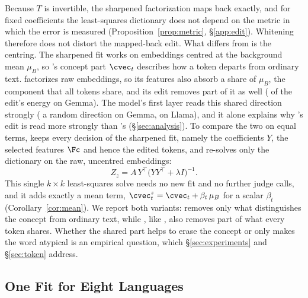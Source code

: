 Because $T$ is invertible, the sharpened factorization maps back exactly, and for fixed coefficients the least-squares dictionary does not depend on the metric in which the error is measured (Proposition~\ref{prop:metric}, \S\ref{app:edit}).
Whitening therefore does not distort the mapped-back edit.
What differs from \ember{} is the centring.
The sharpened fit works on embeddings centred at the background mean $\mu_B$, so \cinder{}'s concept part $\cvec_t$ describes how a token departs from ordinary text.
\ember{} factorizes raw embeddings, so its features also absorb a share of $\mu_B$, the component that all tokens share, and its edit removes part of it as well ( of the edit's energy on Gemma).
The model's first layer reads this shared direction strongly ( a random direction on Gemma,  on Llama), and it alone explains why \ember{}'s edit is read more strongly than \cinder{}'s (\S\ref{sec:analysis}).
To compare the two on equal terms, \cinderz{} keeps every decision of the sharpened fit, namely the coefficients $Y$, the selected features $\Fc$ and hence the edited tokens, and re-solves only the dictionary on the raw, uncentred embeddings:
\begin{equation}
  Z_{z} = A\,Y^{\top}\big(Y Y^{\top} + \lambda I\big)^{-1}.
  \label{eq:cinderz}
\end{equation}
This single $k \times k$ least-squares solve needs no new fit and no further judge calls, and it adds exactly a mean term, $\cvec^{z}_t = \cvec_t + \beta_t\,\mu_B$ for a scalar $\beta_t$ (Corollary~\ref{cor:mean}).
We report both variants: \cinder{} removes only what distinguishes the concept from ordinary text, while \cinderz{}, like \ember{}, also removes part of what every token shares.
Whether the shared part helps to erase the concept or only makes the word atypical is an empirical question, which \S\ref{sec:experiments} and \S\ref{sec:token} address.

\subsection{One Fit for Eight Languages}
\label{sec:ml}

